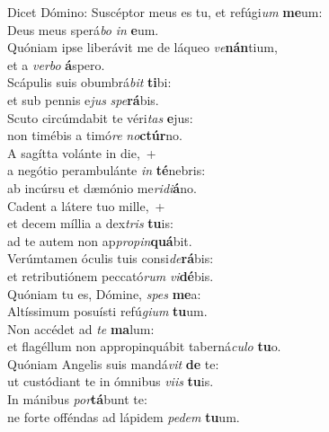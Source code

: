 \evenverse Dicet Dómino: Suscéptor meus es tu, et refúgi\textit{um} \textbf{me}um:~\*\\
\evenverse Deus meus sperá\textit{bo} \textit{in} \textbf{e}um.\\
\oddverse Quóniam ipse liberávit me de láqueo \textit{ve}\textbf{nán}tium,~\*\\
\oddverse et a \textit{ver}\textit{bo} \textbf{á}spero.\\
\evenverse Scápulis suis obumbrá\textit{bit} \textbf{ti}bi:~\*\\
\evenverse et sub pennis e\textit{jus} \textit{spe}\textbf{rá}bis.\\
\oddverse Scuto circúmdabit te véri\textit{tas} \textbf{e}jus:~\*\\
\oddverse non timébis a timó\textit{re} \textit{no}\textbf{ctúr}no.\\
\evenverse A sagítta volánte in die,~+\\
\evenverse  a negótio perambulánte \textit{in} \textbf{té}nebris:~\*\\
\evenverse ab incúrsu et dæmónio me\textit{ri}\textit{di}\textbf{á}no.\\
\oddverse Cadent a látere tuo mille,~+\\
\oddverse  et decem míllia a dex\textit{tris} \textbf{tu}is:~\*\\
\oddverse ad te autem non ap\textit{pro}\textit{pin}\textbf{quá}bit.\\
\evenverse Verúmtamen óculis tuis consi\textit{de}\textbf{rá}bis:~\*\\
\evenverse et retributiónem peccató\textit{rum} \textit{vi}\textbf{dé}bis.\\
\oddverse Quóniam tu es, Dómine, \textit{spes} \textbf{me}a:~\*\\
\oddverse Altíssimum posuísti refú\textit{gi}\textit{um} \textbf{tu}um.\\
\evenverse Non accédet ad \textit{te} \textbf{ma}lum:~\*\\
\evenverse et flagéllum non appropinquábit taberná\textit{cu}\textit{lo} \textbf{tu}o.\\
\oddverse Quóniam Angelis suis mandá\textit{vit} \textbf{de} te:~\*\\
\oddverse ut custódiant te in ómnibus \textit{vi}\textit{is} \textbf{tu}is.\\
\evenverse In mánibus \textit{por}\textbf{tá}bunt te:~\*\\
\evenverse ne forte offéndas ad lápidem \textit{pe}\textit{dem} \textbf{tu}um.\\
